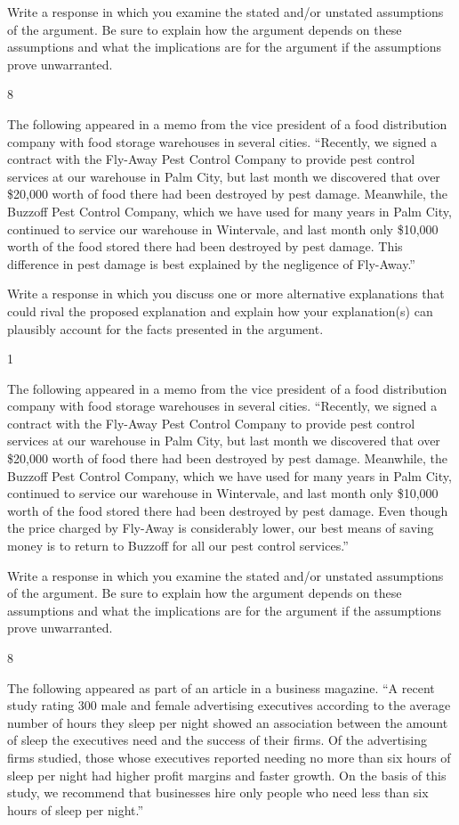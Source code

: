 \documentclass[]{article}
\begin{document}
Write a response in which you examine the stated and/or unstated
assumptions of the argument. Be sure to explain how the argument depends
on these assumptions and what the implications are for the argument if
the assumptions prove unwarranted.

8

The following appeared in a memo from the vice president of a food
distribution company with food storage warehouses in several cities.
``Recently, we signed a contract with the Fly-Away Pest Control Company
to provide pest control services at our warehouse in Palm City, but last
month we discovered that over \$20,000 worth of food there had been
destroyed by pest damage. Meanwhile, the Buzzoff Pest Control Company,
which we have used for many years in Palm City, continued to service our
warehouse in Wintervale, and last month only \$10,000 worth of the food
stored there had been destroyed by pest damage. This difference in pest
damage is best explained by the negligence of Fly-Away.''

Write a response in which you discuss one or more alternative
explanations that could rival the proposed explanation and explain how
your explanation(s) can plausibly account for the facts presented in the
argument.

1

The following appeared in a memo from the vice president of a food
distribution company with food storage warehouses in several cities.
``Recently, we signed a contract with the Fly-Away Pest Control Company
to provide pest control services at our warehouse in Palm City, but last
month we discovered that over \$20,000 worth of food there had been
destroyed by pest damage. Meanwhile, the Buzzoff Pest Control Company,
which we have used for many years in Palm City, continued to service our
warehouse in Wintervale, and last month only \$10,000 worth of the food
stored there had been destroyed by pest damage. Even though the price
charged by Fly-Away is considerably lower, our best means of saving
money is to return to Buzzoff for all our pest control services.''

Write a response in which you examine the stated and/or unstated
assumptions of the argument. Be sure to explain how the argument depends
on these assumptions and what the implications are for the argument if
the assumptions prove unwarranted.

8

The following appeared as part of an article in a business magazine. ``A
recent study rating 300 male and female advertising executives according
to the average number of hours they sleep per night showed an
association between the amount of sleep the executives need and the
success of their firms. Of the advertising firms studied, those whose
executives reported needing no more than six hours of sleep per night
had higher profit margins and faster growth. On the basis of this study,
we recommend that businesses hire only people who need less than six
hours of sleep per night.''
\end{document}
